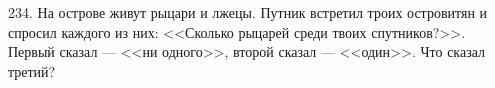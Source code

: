234. На острове живут рыцари и лжецы. Путник встретил троих островитян и спросил каждого из них: <<Сколько рыцарей среди твоих спутников?>>. Первый сказал --- <<ни одного>>,  второй сказал --- <<один>>. Что сказал третий?\\
